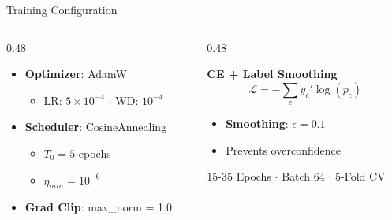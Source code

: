\documentclass[aspectratio=169, 11pt]{beamer}
\begin{document}
\begin{frame}[t]{Training Configuration}
    \begin{columns}[T, onlytextwidth]
        \begin{column}{0.48\textwidth}
            \begin{tcolorbox}[draculabox={Optimizer \& Scheduler}]
                \scriptsize
                \begin{itemize}
                    \item \textbf{Optimizer}: AdamW
                    \begin{itemize}
                        \item LR: $5 \times 10^{-4}$ $\cdot$ WD: $10^{-4}$
                    \end{itemize}
                    \item \textbf{Scheduler}: CosineAnnealing
                    \begin{itemize}
                        \item $T_0 = 5$ epochs
                        \item $\eta_{min} = 10^{-6}$
                    \end{itemize}
                    \item \textbf{Grad Clip}: max\_norm = 1.0
                \end{itemize}
            \end{tcolorbox}
        \end{column}
        \begin{column}{0.48\textwidth}
            \begin{tcolorbox}[orangebox_tcb={Loss Function}]
                \scriptsize
                \textbf{CE + Label Smoothing}
                $$\mathcal{L} = -\sum_c y_c' \log(p_c)$$
                \begin{itemize}
                    \item \textbf{Smoothing}: $\epsilon = 0.1$
                    \item Prevents overconfidence
                \end{itemize}
            \end{tcolorbox}

            \begin{tcolorbox}[greenbox_tcb={Setup}]
                \scriptsize 15-35 Epochs $\cdot$ Batch 64 $\cdot$ 5-Fold CV
            \end{tcolorbox}
        \end{column}
    \end{columns}
\end{frame}
\end{document}
